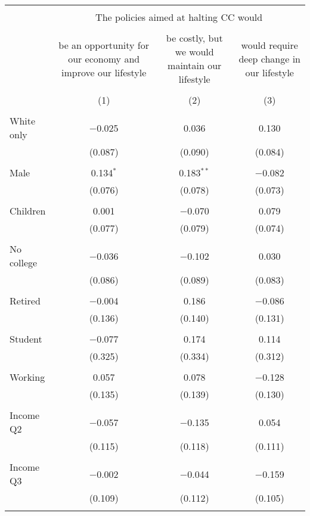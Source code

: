 
\begin{tabular}{@{\extracolsep{5pt}}lccc} 
\\[-1.8ex]\hline 
\hline \\[-1.8ex] 
 & \multicolumn{3}{c}{The policies aimed at halting CC would } \\ 
\cline{2-4} 
\\[-1.8ex] & be an opportunity for our economy and improve our lifestyle & be costly, but we would maintain our lifestyle & would require deep change in our lifestyle \\ 
\\[-1.8ex] & (1) & (2) & (3)\\ 
\hline \\[-1.8ex] 
 White only & $-$0.025 & 0.036 & 0.130 \\ 
  & (0.087) & (0.090) & (0.084) \\ 
  & & & \\ 
 Male & 0.134$^{*}$ & 0.183$^{**}$ & $-$0.082 \\ 
  & (0.076) & (0.078) & (0.073) \\ 
  & & & \\ 
 Children & 0.001 & $-$0.070 & 0.079 \\ 
  & (0.077) & (0.079) & (0.074) \\ 
  & & & \\ 
 No college & $-$0.036 & $-$0.102 & 0.030 \\ 
  & (0.086) & (0.089) & (0.083) \\ 
  & & & \\ 
 Retired & $-$0.004 & 0.186 & $-$0.086 \\ 
  & (0.136) & (0.140) & (0.131) \\ 
  & & & \\ 
 Student & $-$0.077 & 0.174 & 0.114 \\ 
  & (0.325) & (0.334) & (0.312) \\ 
  & & & \\ 
 Working & 0.057 & 0.078 & $-$0.128 \\ 
  & (0.135) & (0.139) & (0.130) \\ 
  & & & \\ 
 Income Q2 & $-$0.057 & $-$0.135 & 0.054 \\ 
  & (0.115) & (0.118) & (0.111) \\ 
  & & & \\ 
 Income Q3 & $-$0.002 & $-$0.044 & $-$0.159 \\ 
  & (0.109) & (0.112) & (0.105) \\ 
  & & & \\ 

\end{tabular}
